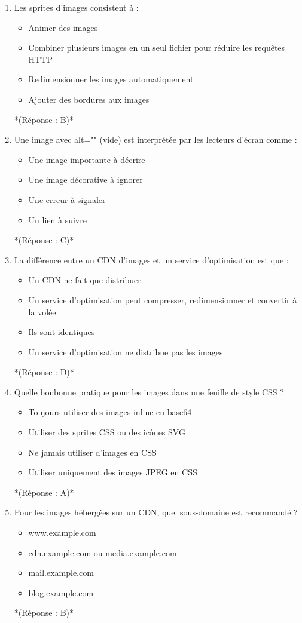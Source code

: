 \documentclass[12pt,a4paper,twoside]{report}
\begin{document}
\begin{enumerate}
\item Les sprites d'images consistent à :
\begin{itemize}
\item[A)] Animer des images
\item[B)] Combiner plusieurs images en un seul fichier pour réduire les requêtes HTTP
\item[C)] Redimensionner les images automatiquement
\item[D)] Ajouter des bordures aux images
\end{itemize}
*(Réponse : B)*

\item Une image avec alt="" (vide) est interprétée par les lecteurs d'écran comme :
\begin{itemize}
\item[A)] Une image importante à décrire
\item[B)] Une image décorative à ignorer
\item[C)] Une erreur à signaler
\item[D)] Un lien à suivre
\end{itemize}
*(Réponse : C)*

\item La différence entre un CDN d'images et un service d'optimisation est que :
\begin{itemize}
\item[A)] Un CDN ne fait que distribuer
\item[B)] Un service d'optimisation peut compresser, redimensionner et convertir à la volée
\item[C)] Ils sont identiques
\item[D)] Un service d'optimisation ne distribue pas les images
\end{itemize}
*(Réponse : D)*

\item Quelle bonbonne pratique pour les images dans une feuille de style CSS ?
\begin{itemize}
\item[A)] Toujours utiliser des images inline en base64
\item[B)] Utiliser des sprites CSS ou des icônes SVG
\item[C)] Ne jamais utiliser d'images en CSS
\item[D)] Utiliser uniquement des images JPEG en CSS
\end{itemize}
*(Réponse : A)*

\item Pour les images hébergées sur un CDN, quel sous-domaine est recommandé ?
\begin{itemize}
\item[A)] www.example.com
\item[B)] cdn.example.com ou media.example.com
\item[C)] mail.example.com
\item[D)] blog.example.com
\end{itemize}
*(Réponse : B)*


\end{enumerate}
\end{document}
